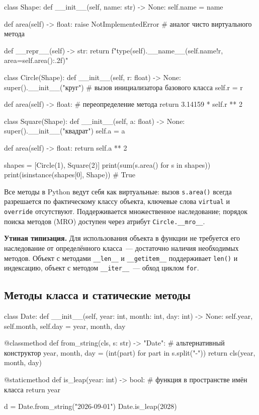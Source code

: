 \documentclass[11pt,a4paper]{article}
\newcommand{\code}[1]{\texttt{#1}}
\begin{document}
\begin{py}
class Shape:
    def __init__(self, name: str) -> None:
        self.name = name

    def area(self) -> float:
        raise NotImplementedError       # аналог чисто виртуального метода

    def __repr__(self) -> str:
        return f"{type(self).__name__}({self.name!r}, area={self.area():.2f})"


class Circle(Shape):
    def __init__(self, r: float) -> None:
        super().__init__("круг")        # вызов инициализатора базового класса
        self.r = r

    def area(self) -> float:            # переопределение метода
        return 3.14159 * self.r ** 2


class Square(Shape):
    def __init__(self, a: float) -> None:
        super().__init__("квадрат")
        self.a = a

    def area(self) -> float:
        return self.a ** 2


shapes = [Circle(1), Square(2)]
print(sum(s.area() for s in shapes))
print(isinstance(shapes[0], Shape))    # True
\end{py}

Все методы в Python ведут себя как виртуальные: вызов \code{s.area()} всегда разрешается
по фактическому классу объекта, ключевые слова \code{virtual} и \code{override} отсутствуют.
Поддерживается множественное наследование; порядок поиска методов (MRO) доступен через
атрибут \code{Circle.\_\_mro\_\_}.

\textbf{Утиная типизация.} Для использования объекта в функции не требуется его наследование
от определённого класса~— достаточно наличия необходимых методов. Объект с методами
\code{\_\_len\_\_} и \code{\_\_getitem\_\_} поддерживает \code{len()} и индексацию, объект
с методом \code{\_\_iter\_\_}~— обход циклом \code{for}.

\subsection{Методы класса и статические методы}

\begin{py}
class Date:
    def __init__(self, year: int, month: int, day: int) -> None:
        self.year, self.month, self.day = year, month, day

    @classmethod
    def from_string(cls, s: str) -> "Date":     # альтернативный конструктор
        year, month, day = (int(part) for part in s.split("-"))
        return cls(year, month, day)

    @staticmethod
    def is_leap(year: int) -> bool:             # функция в пространстве имён класса
        return year %


d = Date.from_string("2026-09-01")
Date.is_leap(2028)
\end{py}
\end{document}
